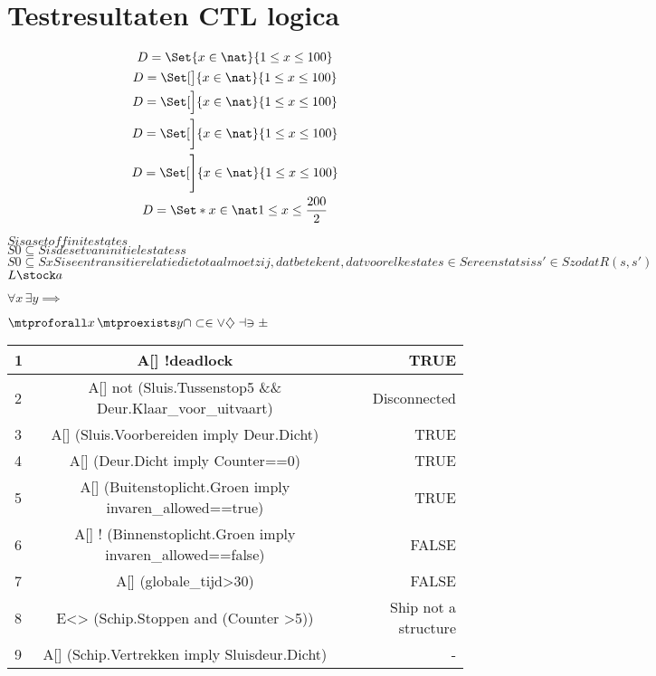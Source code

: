  
 \chapter{Testresultaten CTL logica}
 
 
 
 \begin{center}
 	\begin{gather*}
 		D=\Set{x\in\nat}{1\le x\le 100}\\
 		D=\Set[\big]{x\in\nat}{1\le x\le 100}\\
 		D=\Set[\Big]{x\in\nat}{1\le x\le 100}\\
 		D=\Set[\bigg]{x\in\nat}{1\le x\le 100}\\
 		D=\Set[\Bigg]{x\in\nat}{1\le x\le 100}\\
 		D=\Set*{x\in\nat}{1\le x\le \frac{200}{2}}
 	\end{gather*}
 \end{center}
 
 
 
 
 
 $S is a set of finite states$\\
 $S0 \subseteq S is de set van initiele statess$ \\
 $S0 \subseteq S xS  is een transitie relatie die totaal moet zij, dat betekent, dat voor elke state s \in S er een stats is s' \in S zodat R(s,s')$
 $L\stock a$
 
 $\forall x\,\exists y \implies $
 
 $\mtproforall x\,\mtproexists y \cap \subset \in \vee \diamondsuit \dashv \ni \pm$
 
 
 
 \begin{center}
 	\begin{tabular}{| l | c || r | }
 		\hline
 		1 &A[] !deadlock  &  TRUE \\ \hline
 		2 & A[] not (Sluis.Tussenstop5 \&\& Deur.Klaar\_voor\_uitvaart)  &  Disconnected \\ \hline
 		3 & A[]  (Sluis.Voorbereiden imply Deur.Dicht)   &  TRUE\\   \hline
 		4 &A[]  (Deur.Dicht imply Counter==0)   & TRUE  \\   \hline
 		5 & A[]  (Buitenstoplicht.Groen imply invaren\_allowed==true)  &  TRUE \\ \hline
 		6 & A[] ! (Binnenstoplicht.Groen imply invaren\_allowed==false)  & FALSE \\ \hline
 		7 & A[]  (globale\_tijd>30)   &  FALSE\\    \hline
 		8 & E<>  (Schip.Stoppen and (Counter >5))   & Ship not a structure  \\   \hline
 		9 & A[] (Schip.Vertrekken imply Sluisdeur.Dicht)  &  -  \\   \hline
 		\hline
 	\end{tabular}
 \end{center}
 
